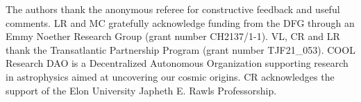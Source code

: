\documentclass{aa}
\begin{document}
\begin{acknowledgements}
The authors thank the anonymous referee for constructive feedback and useful comments. LR and MC gratefully acknowledge funding from the DFG through an Emmy Noether Research Group (grant number CH2137/1-1). VL, CR and LR thank the Transatlantic Partnership Program (grant number TJF21\_053). COOL Research DAO is a Decentralized Autonomous Organization supporting research in astrophysics aimed at uncovering our cosmic origins. CR acknowledges the support of the Elon University Japheth E. Rawls Professorship.
\end{acknowledgements}

 
\end{document}
